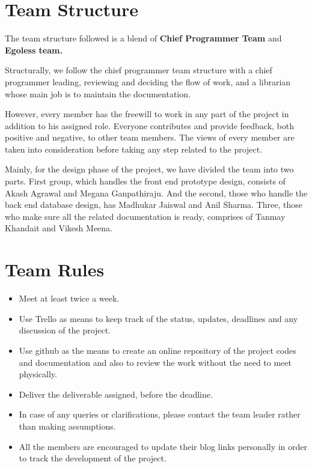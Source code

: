 \documentclass{article}
\begin{document}
\section{Team Structure}
The team structure followed is a blend of \textbf{Chief Programmer Team} and \textbf{Egoless team.}
\par Structurally, we follow the chief programmer team structure with a chief programmer leading, reviewing and deciding the flow of work, and a librarian whose main job is to maintain the documentation.
\par However, every member has the freewill to work in any part of the project in addition to his assigned role. Everyone contributes and provide feedback, both positive and negative, to other team members. The views of every member are taken into consideration before taking any step related to the project.

\par Mainly, for the design phase of the project, we have divided the team into two parts. First group, which handles the front end prototype design, consists of Akash Agrawal and Megana Ganpathiraju. And the second, those who handle the back end database design, has Madhukar Jaiswal and Anil Sharma. Three, those who make sure all the related documentation is ready, comprises of Tanmay Khandait and Vikesh Meena.

\section{Team Rules}
\begin{itemize}
    \item Meet at least twice a week.
    \item Use Trello as means to keep track of the status, updates, deadlines and any discussion of the project.
    \item Use github as the means to create an online repository of the project codes and documentation and also to review the work without the need to meet physically.
    \item Deliver the deliverable assigned, before the deadline.
    \item In case of any queries or clarifications, please contact the team leader rather than making assumptions.
    \item All the members are encouraged to update their blog links personally in order to track the development of the project.
\end{itemize}
\end{document}
